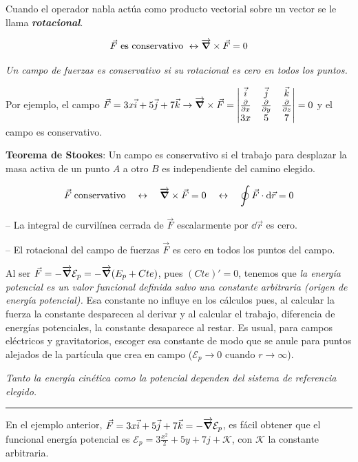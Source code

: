 Cuando el operador nabla actúa como producto vectorial sobre un vector se le llama \textbf{\emph{rotacional}}.


$$\vec F \text{ es conservativo } \leftrightarrow \overrightarrow{\grad } \times \vec F = 0$$ 

\emph{Un campo de fuerzas es conservativo si su rotacional es cero en todos los puntos.}

\textcolor{gris}{Por ejemplo, el campo $\vec F=3x\vec i+5\vec j+7\vec k \to \overrightarrow{\grad } \times \vec F = \left| \begin{matrix} \vec i&\vec j&\vec k \\ \pdv{x}&\pdv{y}&\pdv{z} \\ 3x&5&7  \end{matrix} \right|=0$ y el campo es conservativo}.

\textbf{Teorema de Stookes}: Un campo es conservativo si el trabajo para desplazar la masa activa de un punto $A$ a otro $B$ es independiente del camino elegido.

\begin{equation}
\label{Th-Stookes}
	\vec F \text{\;conservativo} \quad \leftrightarrow \quad  \overrightarrow{\grad } \times \vec F = 0 \quad \leftrightarrow \quad \oint \vec F \cdot \dd \vec r =0
\end{equation}

-- La integral de curvilínea cerrada de $\vec F$ escalarmente por $\dd \vec r$ es cero.

-- El rotacional del campo de fuerzas $\vec F$ es cero en todos los puntos del campo.

Al ser $\vec F=- \overrightarrow{\grad} \mathcal E_p = - \overrightarrow{\grad} \mathcal (E_p+ Cte)$, pues $(Cte)'=0$, tenemos que \emph{la energía potencial es un valor funcional definida salvo una constante arbitraria (origen de energía potencial).} Esa constante no influye en los cálculos pues, al calcular la fuerza la constante desparecen al derivar y al calcular el trabajo, diferencia de energías potenciales, la constante desaparece al restar. Es usual, para campos eléctricos y gravitatorios, escoger esa constante de modo que se anule para puntos alejados de la partícula que crea en campo ($\mathcal E_p \to 0$ cuando $r\to \infty$).
 
 
 \emph{Tanto la energía cinética como la potencial dependen del sistema de referencia elegido.}

\rule{150pt}{0.4pt} 

En el ejemplo anterior, $\vec F = 3x\vec i + 5 \vec j+7\vec k=\displaystyle - \overrightarrow{\grad} \mathcal E_p$, es fácil obtener que el funcional energía potencial es $\mathcal E_p=3\frac{x^2}2+5y+7j+\mathcal K$, con $\mathcal K$ la constante arbitraria.

